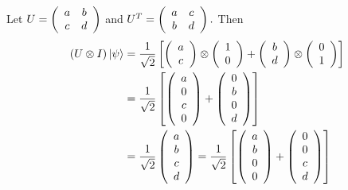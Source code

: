 \documentclass[11pt]{article}
\begin{document}
Let $U=\left(\begin{array}[c]{cc}a & b\\c & d\\\end{array}\right)$ and $U^T=\left(\begin{array}[c]{cc}a & c\\b & d\\\end{array}\right).$ Then
\begin{align*}
    (U\otimes I)\ket{\psi}&=\frac{1}{\sqrt{2}}\left[\left(\begin{array}[c]{c}a\\c\end{array}\right)\otimes\left(\begin{array}[c]{c}1\\0\end{array}\right)
    +\left(\begin{array}[c]{c}b\\d\end{array}\right)\otimes\left(\begin{array}[c]{c}0\\1\end{array}\right)\right]\\
                          &=\frac{1}{\sqrt{2}}\left[\left(\begin{array}[c]{c}a\\0\\c\\0\end{array}\right)+\left(\begin{array}[c]{c}0\\b\\0\\d\end{array}\right)\right]\\
                          &=\frac{1}{\sqrt{2}}\left(\begin{array}[c]{c}a\\b\\c\\d\end{array}\right)=
                          \frac{1}{\sqrt{2}}\left[\left(\begin{array}[c]{c}a\\b\\0\\0\end{array}\right)+\left(\begin{array}[c]{c}0\\0\\c\\d\end{array}\right)\right]\\

\end{align*}
\end{document}
